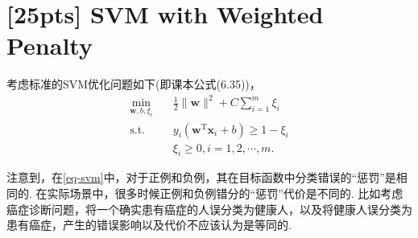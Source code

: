 \documentclass[a4paper,UTF8]{article}
\numberwithin{equation}{section}
\begin{document}
\section{[25pts] SVM with Weighted Penalty}
考虑标准的SVM优化问题如下(即课本公式(6.35))，
\begin{equation}
	\label{eq-svm}
	\begin{split}
		\min_{\mathbf{w},b,\xi_i}& \quad \frac{1}{2} \lVert \mathbf{w} \rVert^2 + C\sum_{i=1}^m\xi_i\\
		\text{s.t.}&  \quad y_i(\mathbf{w}^\mathrm{T}\mathbf{x}_i + b)\geq 1-\xi_i\\
		& \quad \xi_i \geq 0, i = 1,2,\cdots,m.
	\end{split}
\end{equation}

注意到，在\eqref{eq-svm}中，对于正例和负例，其在目标函数中分类错误的“惩罚”是相同的. 在实际场景中，很多时候正例和负例错分的“惩罚”代价是不同的. 比如考虑癌症诊断问题，将一个确实患有癌症的人误分类为健康人，以及将健康人误分类为患有癌症，产生的错误影响以及代价不应该认为是等同的.
\end{document}
